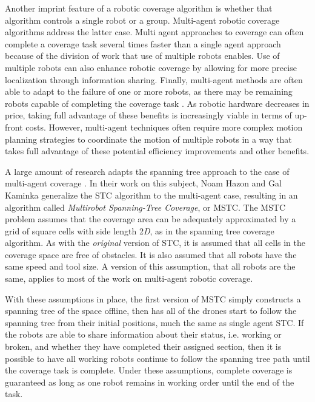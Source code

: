 Another imprint feature of a robotic coverage algorithm is whether that algorithm controls a single robot or a group. Multi-agent robotic coverage algorithms address the latter case. Multi agent approaches to coverage can often complete a coverage task several times faster than a single agent approach because of the division of work that use of multiple robots enables. Use of multiple robots can also enhance robotic coverage by allowing for more precise localization through information sharing. Finally, multi-agent methods are often able to adapt to the failure of one or more robots, as there may be remaining robots capable of completing the coverage task \cite{Choset}. As robotic hardware decreases in price, taking full advantage of these benefits is increasingly viable in terms of up-front costs. However, multi-agent techniques often require more complex motion planning strategies to coordinate the motion of multiple robots in a way that takes full advantage of these potential efficiency improvements and other benefits.


A large amount of research adapts the spanning tree approach to the case of multi-agent coverage \cite{Zheng}\cite{Hazon}. In their work on this subject, Noam Hazon and Gal Kaminka generalize the STC algorithm to the multi-agent case, resulting in an algorithm called \textit{Multirobot Spanning-Tree Coverage}, or MSTC. The MSTC problem assumes that the coverage area can be adequately approximated by a grid of square cells with side length 2\textit{D}, as in the spanning tree coverage algorithm. As with the \textit{original} version of STC, it is assumed that all cells in the coverage space are free of obstacles. It is also assumed that all robots have the same speed and tool size. A version of this assumption, that all robots are the same, applies to most of the work on multi-agent robotic coverage.


With these assumptions in place, the first version of MSTC simply constructs a spanning tree of the space offline, then has all of the drones start to follow the spanning tree from their initial positions, much the same as single agent STC. If the robots are able to share information about their status, i.e. working or broken, and whether they have completed their assigned section, then it is possible to have all working robots continue to follow the spanning tree path until the coverage task is complete. Under these assumptions, complete coverage is guaranteed as long as one robot remains in working order until the end of the task.

